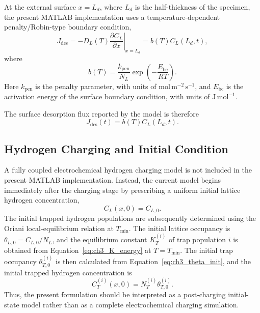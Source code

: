 \documentclass[a4paper,12pt,oneside]{report}
\begin{document}
At the external surface $x=L_d$, where $L_d$ is the half-thickness of the specimen, the present MATLAB implementation uses a temperature-dependent penalty/Robin-type boundary condition,
\begin{equation}
J_{\mathrm{des}}
=
-D_L(T)
\left.
\frac{\partial C_L}{\partial x}
\right|_{x=L_d}
=
b(T)C_L(L_d,t),
\label{eq:ch3_surface_bc}
\end{equation}
where
\begin{equation}
b(T)
=
\frac{k_{\mathrm{pen}}}{N_L}
\exp\left(
-\frac{E_{\mathrm{bc}}}{RT}
\right).
\label{eq:ch3_bc_factor}
\end{equation}
Here $k_{\mathrm{pen}}$ is the penalty parameter, with units of $\mathrm{mol\,m^{-2}\,s^{-1}}$, and $E_{\mathrm{bc}}$ is the activation energy of the surface boundary condition, with units of $\mathrm{J\,mol^{-1}}$.

The surface desorption flux reported by the model is therefore
\begin{equation}
J_{\mathrm{des}}(t)
=
b(T)C_L(L_d,t).
\label{eq:ch3_desorption_flux}
\end{equation}

\subsection{Hydrogen Charging and Initial Condition}

A fully coupled electrochemical hydrogen charging model is not included in the present MATLAB implementation. Instead, the current model begins immediately after the charging stage by prescribing a uniform initial lattice hydrogen concentration,
\begin{equation}
C_L(x,0)=C_{L,0}.
\label{eq:ch3_initial_lattice}
\end{equation}
The initial trapped hydrogen populations are subsequently determined using the Oriani local-equilibrium relation at $T_{\min}$. The initial lattice occupancy is $\theta_{L,0}=C_{L,0}/N_L$, and the equilibrium constant $K_T^{(i)}$ of trap population $i$ is obtained from Equation~\eqref{eq:ch3_K_energy} at $T=T_{\min}$. The initial trap occupancy $\theta_{T,0}^{(i)}$ is then calculated from Equation~\eqref{eq:ch3_theta_init}, and the initial trapped hydrogen concentration is
\begin{equation}
C_T^{(i)}(x,0)
=
N_T^{(i)}
\theta_{T,0}^{(i)}.
\label{eq:ch3_initial_trap}
\end{equation}
Thus, the present formulation should be interpreted as a post-charging initial-state model rather than as a complete electrochemical charging simulation.
\end{document}
